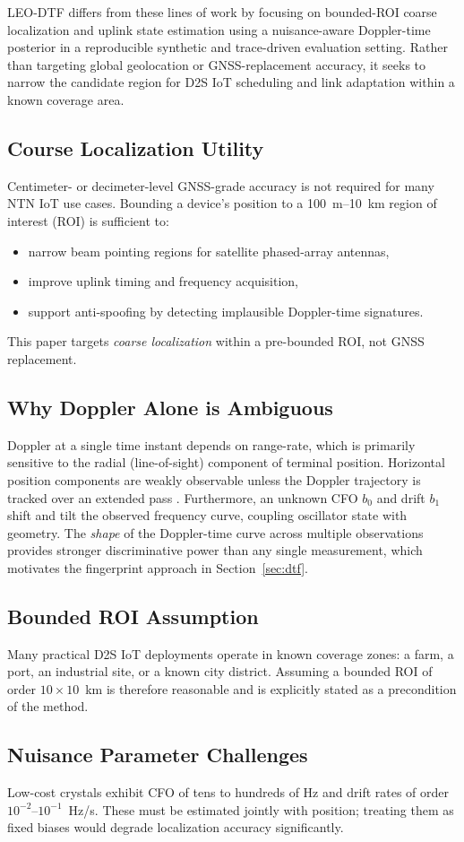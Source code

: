 LEO-DTF differs from these lines of work by focusing on bounded-ROI
coarse localization and uplink state estimation using a nuisance-aware
Doppler-time posterior in a reproducible synthetic and trace-driven
evaluation setting.  Rather than targeting global geolocation or
GNSS-replacement accuracy, it seeks to narrow the candidate region
for D2S IoT scheduling and link adaptation within a known coverage area.

\subsection{Course Localization Utility}
Centimeter- or decimeter-level GNSS-grade accuracy is not required for many
NTN IoT use cases.  Bounding a device's position to a 100~m--10~km region of
interest (ROI) is sufficient to:
\begin{itemize}
  \item narrow beam pointing regions for satellite phased-array antennas,
  \item improve uplink timing and frequency acquisition,
  \item support anti-spoofing by detecting implausible Doppler-time signatures.
\end{itemize}
This paper targets \emph{coarse localization} within a pre-bounded ROI, not
GNSS replacement.

\subsection{Why Doppler Alone is Ambiguous}
Doppler at a single time instant depends on range-rate, which is primarily
sensitive to the radial (line-of-sight) component of terminal position.
Horizontal position components are weakly observable unless the Doppler
trajectory is tracked over an extended pass \cite{liu_geometric_2026}.
Furthermore, an unknown CFO $b_0$ and drift $b_1$ shift and tilt the
observed frequency curve, coupling oscillator state with geometry.
The \emph{shape} of the Doppler-time curve across multiple observations
provides stronger discriminative power than any single measurement, which
motivates the fingerprint approach in Section~\ref{sec:dtf}.

\subsection{Bounded ROI Assumption}
Many practical D2S IoT deployments operate in known coverage zones: a farm,
a port, an industrial site, or a known city district.  Assuming a bounded ROI
of order $10 \times 10$~km is therefore reasonable and is explicitly stated
as a precondition of the method.

\subsection{Nuisance Parameter Challenges}
Low-cost crystals exhibit CFO of tens to hundreds of Hz and drift rates of
order $10^{-2}$--$10^{-1}$~Hz/s.  These must be estimated jointly with
position; treating them as fixed biases would degrade localization accuracy
significantly.


